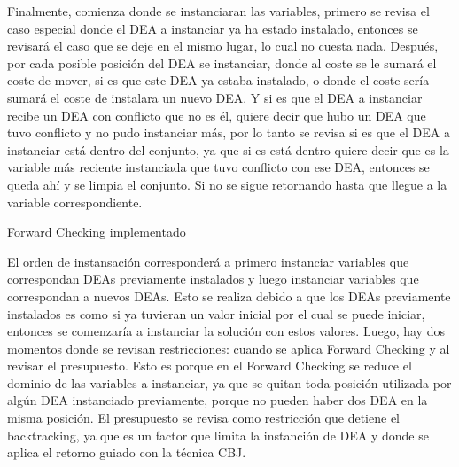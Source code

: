 \documentclass[letter, 10pt]{article}
\begin{document}
Finalmente, comienza donde se instanciaran las variables, primero se revisa el caso especial donde el DEA a instanciar ya ha estado instalado, entonces se revisar\'a el caso que se deje en el mismo lugar, lo cual no cuesta nada. Despu\'es, por cada posible posici\'on del DEA se instanciar, donde al coste se le sumar\'a el coste de mover, si es que este DEA ya estaba instalado, o donde el coste ser\'ia sumar\'a el coste de instalara un nuevo DEA. Y si es que el DEA a instanciar recibe un DEA con conflicto que no es \'el, quiere decir que hubo un DEA que tuvo conflicto y no pudo instanciar m\'as, por lo tanto se revisa si es que el DEA a instanciar est\'a dentro del conjunto, ya que si es est\'a dentro quiere decir que es la variable m\'as reciente instanciada que tuvo conflicto con ese DEA, entonces se queda ah\'i y se limpia el conjunto. Si no se sigue retornando hasta que llegue a la variable correspondiente.


\begin{algorithm}[h!]
\SetAlgoLined
{}
\caption{Forward Checking implementado}
\end{algorithm}

El orden de instansaci\'on corresponder\'a a primero instanciar variables que correspondan DEAs previamente instalados y luego instanciar variables que correspondan a nuevos DEAs. Esto se realiza debido a que los DEAs previamente instalados es como si ya tuvieran un valor inicial por el cual se puede iniciar, entonces se comenzar\'ia a instanciar la soluci\'on con estos valores. Luego, hay dos momentos donde se revisan restricciones: cuando se aplica Forward Checking y al revisar el presupuesto. Esto es porque en el Forward Checking se reduce el dominio de las variables a instanciar, ya que se quitan toda posici\'on utilizada por alg\'un DEA instanciado previamente, porque no pueden haber dos DEA en la misma posici\'on. El presupuesto se revisa como restricci\'on que detiene el backtracking, ya que es un factor que limita la instanci\'on de DEA y donde se aplica el retorno guiado con la t\'ecnica CBJ.
\end{document}

